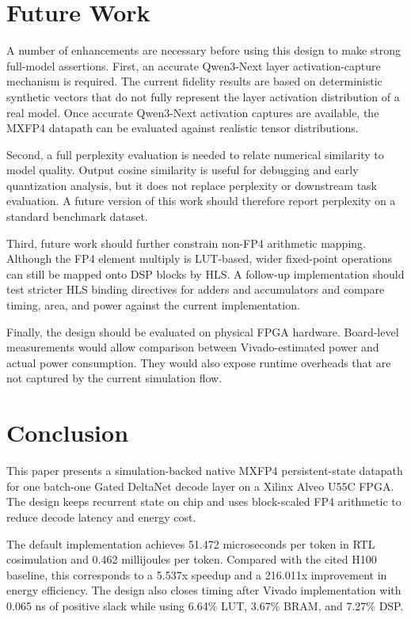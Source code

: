 ﻿\documentclass[conference]{IEEEtran}
\begin{document}
\section{Future Work}
A number of enhancements are necessary before using this design to make strong full-model assertions. First, an accurate Qwen3-Next layer activation-capture mechanism is required. The current fidelity results are based on deterministic synthetic vectors that do not fully represent the layer activation distribution of a real model. Once accurate Qwen3-Next activation captures are available, the MXFP4 datapath can be evaluated against realistic tensor distributions.

Second, a full perplexity evaluation is needed to relate numerical similarity to model quality. Output cosine similarity is useful for debugging and early quantization analysis, but it does not replace perplexity or downstream task evaluation. A future version of this work should therefore report perplexity on a standard benchmark dataset.

Third, future work should further constrain non-FP4 arithmetic mapping. Although the FP4 element multiply is LUT-based, wider fixed-point operations can still be mapped onto DSP blocks by HLS. A follow-up implementation should test stricter HLS binding directives for adders and accumulators and compare timing, area, and power against the current implementation.

Finally, the design should be evaluated on physical FPGA hardware. Board-level measurements would allow comparison between Vivado-estimated power and actual power consumption. They would also expose runtime overheads that are not captured by the current simulation flow.

\section{Conclusion}
This paper presents a simulation-backed native MXFP4 persistent-state datapath for one batch-one Gated DeltaNet decode layer on a Xilinx Alveo U55C FPGA. The design keeps recurrent state on chip and uses block-scaled FP4 arithmetic to reduce decode latency and energy cost.

The default implementation achieves 51.472 microseconds per token in RTL cosimulation and 0.462 millijoules per token. Compared with the cited H100 baseline, this corresponds to a 5.537x speedup and a 216.011x improvement in energy efficiency. The design also closes timing after Vivado implementation with 0.065 ns of positive slack while using 6.64\% LUT, 3.67\% BRAM, and 7.27\% DSP.
\end{document}
